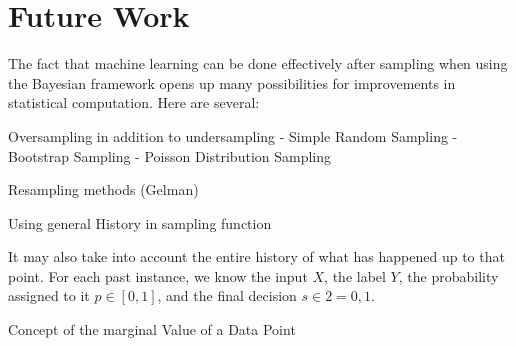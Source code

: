 \documentclass[twoside]{article}
\begin{document}
\section{Future Work}

The fact that machine learning can be done effectively after sampling when using the Bayesian framework opens up many possibilities for improvements in statistical computation. Here are several:

Oversampling in addition to undersampling
- Simple Random Sampling
- Bootstrap Sampling
- Poisson Distribution Sampling

Resampling methods (Gelman)

Using general History in sampling function

It may also take into account the entire history of what has happened up to that point. For each past instance, we know the input \(X\), the label \(Y\), the probability assigned to it \(p \in \left [ 0, 1\right ]\), and the final decision \(s \in 2 = {0, 1}\).

Concept of the marginal Value of a Data Point
\end{document}
